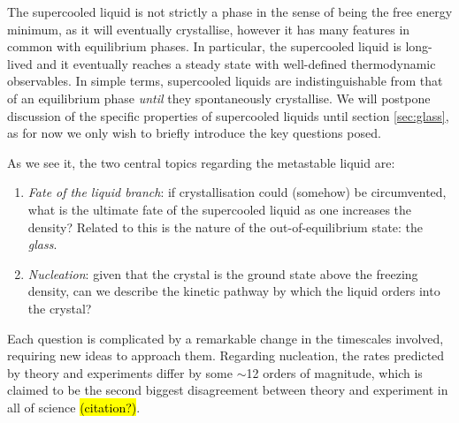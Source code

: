 \documentclass[11pt,twoside]{report}
\begin{document}
The supercooled liquid is not strictly a phase in the sense of being the free energy minimum, as it will eventually crystallise, however it has many features in common with equilibrium phases.
In particular, the supercooled liquid is long-lived and it eventually reaches a steady state with well-defined thermodynamic observables.
In simple terms, supercooled liquids are indistinguishable from that of an equilibrium phase \emph{until} they spontaneously crystallise.
We will postpone discussion of the specific properties of supercooled liquids until section \ref{sec:glass}, as for now we only wish to briefly introduce the key questions posed.

As we see it, the two central topics regarding the metastable liquid are:
\begin{enumerate}
\item \emph{Fate of the liquid branch}: if crystallisation could (somehow) be circumvented, what is the ultimate fate of the supercooled liquid as one increases the density?
  Related to this is the nature of the out-of-equilibrium state: the \emph{glass}.
\item \emph{Nucleation}: given that the crystal is the ground state above the freezing density, can we describe the kinetic pathway by which the liquid orders into the crystal?
\end{enumerate}
Each question is complicated by a remarkable change in the timescales involved, requiring new ideas to approach them.
Regarding nucleation, the rates predicted by theory and experiments differ by some $\sim$12 orders of magnitude, which is claimed to be the second biggest disagreement%
between theory and experiment in all of science \hl{(citation?)}.
\end{document}

